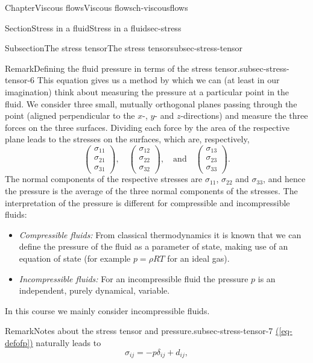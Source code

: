 \documentclass[oneside,10pt,]{book}
\newcommand{\xreffont}{\relax}
\numberwithin{equation}{section}
\begin{document}
\begin{chapterptx}{Chapter}{Viscous flows}{}{Viscous flows}{}{}{ch-viscousflows}
\begin{sectionptx}{Section}{Stress in a fluid}{}{Stress in a fluid}{}{}{sec-stress}
\begin{subsectionptx}{Subsection}{The stress tensor}{}{The stress tensor}{}{}{subsec-stress-tensor}
\begin{remark}{Remark}{Defining the fluid pressure in terms of the stress tensor.}{subsec-stress-tensor-6}
This equation gives us a method by which we can (at least in our imagination) think about measuring the pressure at a particular point in the fluid. We consider three small, mutually orthogonal planes passing through the point (aligned perpendicular to the \(x\)-, \(y\)- and \(z\)-directions) and measure the three forces on the three surfaces. Dividing each force by the area of the respective plane leads to the stresses on the surfaces, which are, respectively,%
\begin{equation*}
\left(\begin{matrix}\sigma_{11}\\\sigma_{21}\\\sigma_{31}\end{matrix}\right),\quad
\left(\begin{matrix}\sigma_{12}\\\sigma_{22}\\\sigma_{32}\end{matrix}\right),
\quad\textrm{and}\quad
\left(\begin{matrix}\sigma_{13}\\\sigma_{23}\\\sigma_{33}\end{matrix}\right).
\end{equation*}
The normal components of the respective stresses are \(\sigma_{11}\), \(\sigma_{22}\) and \(\sigma_{33}\), and hence the pressure is the average of the three normal components of the stresses. The interpretation of the pressure is different for compressible and incompressible fluids:%
\begin{itemize}[label=\textbullet]
\item{}\emph{Compressible fluids:} From classical thermodynamics it is known that we can define the pressure of the fluid as a parameter of state, making use of an equation of state (for example \(p=\rho RT\) for an ideal gas).%
\item{}\emph{Incompressible fluids:} For an incompressible fluid the pressure \(p\) is an independent, purely dynamical, variable.%
\end{itemize}
In this course we mainly consider incompressible fluids.%
\end{remark}
\begin{remark}{Remark}{Notes about the stress tensor and pressure.}{subsec-stress-tensor-7}%
\hyperref[eq-defofp]{({\xreffont\ref{eq-defofp}})} naturally leads to%
\begin{equation*}
\sigma_{ij}=-p \delta_{ij}+d_{ij},
\end{equation*}

\end{remark}
\end{subsectionptx}
\end{sectionptx}
\end{chapterptx}
\end{document}
